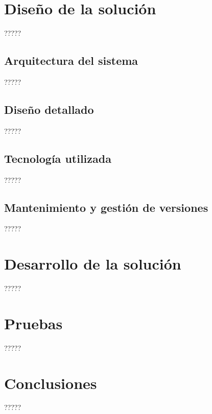 \documentclass[11pt,spanish,listoffigures]{tfgetsinf}
\begin{document}
\chapter{Diseño de la solución}

?????

\section{Arquitectura del sistema}

?????

\section{Diseño detallado}

?????

\section{Tecnología utilizada}

?????

\section{Mantenimiento y gestión de versiones}

?????


\chapter{Desarrollo de la solución}

?????


\chapter{Pruebas}

?????


\chapter{Conclusiones}

?????

\end{document}
